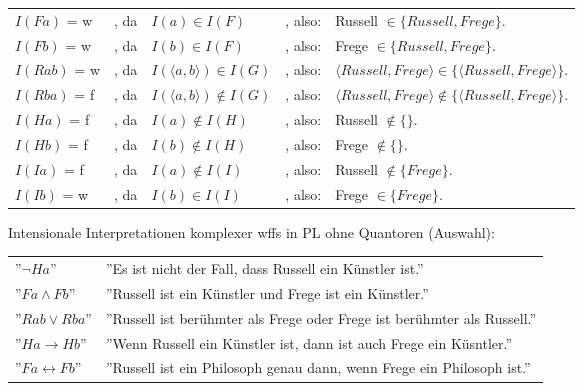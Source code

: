 \documentclass{scrartcl}
\begin{document}
\begin{tabularx}{\linewidth}{l l l l l}
	$ I(Fa) $ = w & , da & $ I(a) \in I(F) $ & , also: & Russell $ \in \{ Russell,Frege \} $. \\
	$ I(Fb) $ = w & , da & $ I(b) \in I(F) $ & , also: & Frege $ \in \{ Russell, Frege \} $. \\
	$ I(Rab) $ = w & , da & $ I(\langle a,b \rangle) \in I(G) $ & , also: & $ \langle Russell,Frege \rangle \in \{ \langle Russell,Frege \rangle \} $. \\
	$ I(Rba) $ = f & , da & $ I(\langle a,b \rangle) \not \in I(G) $ & , also: & $ \langle Russell,Frege \rangle \not \in \{ \langle Russell,Frege \rangle \} $. \\
	$ I(Ha) $ = f & , da & $ I(a) \not \in I(H) $ & , also: & Russell $ \not \in \{\} $. \\
	$ I(Hb) $ = f & , da & $ I(b) \not \in I(H) $ & , also: & Frege $ \not \in \{\} $. \\
	$ I(Ia) $ = f & , da & $ I(a) \not \in I(I) $ & , also: & Russell $ \not \in \{ Frege \} $. \\
	$ I(Ib) $ = w & , da & $ I(b) \in I(I) $ & , also: & Frege $ \in \{ Frege \} $. \\
\end{tabularx}

Intensionale Interpretationen komplexer wffs in PL ohne Quantoren (Auswahl): \\

\begin{tabularx}{\linewidth}{l l}
	''$ \neg Ha $'' & ''Es ist nicht der Fall, dass Russell ein Künstler ist.'' \\
	''$ Fa \wedge Fb $'' & ''Russell ist ein Künstler und Frege ist ein Künstler.'' \\
	''$ Rab \vee Rba $'' & ''Russell ist berühmter als Frege oder Frege ist berühmter als Russell.'' \\
	''$ Ha \rightarrow Hb $'' & ''Wenn Russell ein Künstler ist, dann ist auch Frege ein Küsntler.'' \\
	''$ Fa \leftrightarrow Fb $'' & ''Russell ist ein Philosoph genau dann, wenn Frege ein Philosoph ist.''
\end{tabularx} \\
\end{document}
